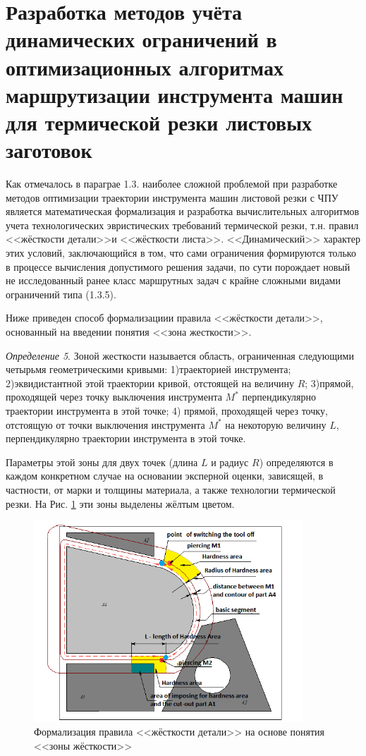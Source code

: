 \documentclass[11pt,twoside]{report}
\begin{document}
\section{Разработка методов учёта динамических ограничений
  в оптимизационных алгоритмах маршрутизации инструмента машин для термической резки листовых заготовок}

Как отмечалось в параграе 1.3.
наиболее сложной проблемой при разработке методов оптимизации
траектории инструмента машин листовой резки с ЧПУ
является математическая формализация и
разработка вычислительных алгоритмов учета
технологических эвристических требований термической резки,
т.н. правил <<жёсткости детали>>и <<жёсткости листа>>.
<<Динамический>> характер этих условий, заключающийся в том,
что сами ограничения формируются только в процессе вычисления
допустимого решения задачи, по сути порождает
новый не исследованный ранее класс маршрутных задач
с крайне сложными видами ограничений типа (1.3.5).

Ниже приведен способ формализациии правила <<жёсткости детали>>,
основанный на введении понятия <<зона жесткости>>.

{\it Определение 5}.
Зоной жесткости называется область,
ограниченная следующими четырьмя геометрическими кривыми:
1)траекторией инструмента;
2)эквидистантной этой траектории кривой, отстоящей на величину $R$;
3)прямой, проходящей через точку выключения инструмента $M^*$
перпендикулярно траектории инструмента в этой точке;
4) прямой, проходящей через точку,
отстоящую от точки выключения инструмента $M^*$ на некоторую величину $L$,
перпендикулярно траектории инструмента в этой точке.

Параметры этой зоны для двух точек
(длина $L$ и радиус $R$)
определяются в каждом конкретном случае
на основании эксперной оценки,
зависящей, в частности, от марки и толщины материала,
а также технологии термической резки.
На Рис. \ref{hardness-area}
эти зоны выделены жёлтым цветом.

\begin{figure}
 \begin{center}
  \includegraphics[width=0.9\textwidth]{hardness-area.png}
  \caption{Формализация правила <<жёсткости детали>> на основе понятия <<зоны жёсткости>>}
  \label{hardness-area}
  \end{center}
\end{figure}
\end{document}
